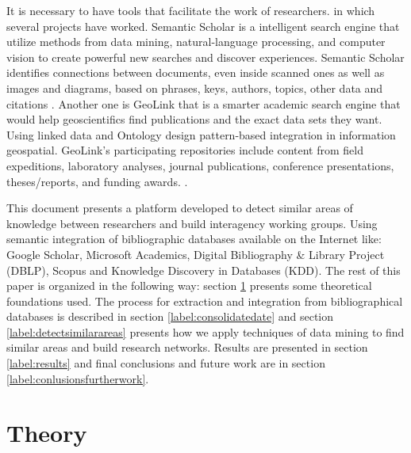 \documentclass[11pt]{article}
\begin{document}
It is necessary to have tools that facilitate the work of researchers. in which several projects have worked. Semantic Scholar is a intelligent search engine that  utilize methods from data mining, natural-language processing, and computer vision to create powerful new searches and discover experiences. Semantic Scholar identifies connections between documents, even inside scanned ones as well as images and diagrams, based on phrases, keys, authors, topics, other data and citations \cite{semanticscholar}. Another one is GeoLink that is a smarter academic search engine that would help geoscientifics find publications and the exact data sets they want. Using linked data and Ontology design pattern-based integration in information geospatial. GeoLink's participating repositories include content from field expeditions, laboratory analyses, journal publications, conference presentations, theses/reports, and funding awards. \cite{Krisnadhi01} \cite{Krisnadhi02}.



This document presents a platform developed to detect similar areas of knowledge between  researchers and build interagency working groups. Using semantic integration of bibliographic databases available on the Internet like: Google Scholar, Microsoft Academics, Digital Bibliography \& Library Project (DBLP), Scopus and Knowledge Discovery in Databases (KDD). The rest of this paper is organized in the following way: section \ref{label:theory} presents some theoretical foundations used. The process for extraction and integration from bibliographical databases is described in section \ref{label:consolidatedate} and section \ref{label:detectsimilarareas} presents how we apply techniques of data mining  to find similar areas and build research networks. Results are presented in section \ref{label:results} and final conclusions and future work are in section \ref{label:conlusionsfurtherwork}.

\section{Theory}
\label{label:theory}
\end{document}
